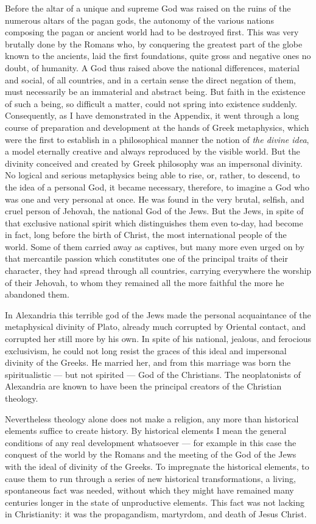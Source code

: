 \documentclass[12pt]{report}
\begin{document}
Before the altar of a unique and supreme God was raised on the ruins of the numerous altars of the pagan gods, the autonomy of the various nations composing the pagan or ancient world had to be destroyed first. This was very brutally done by the Romans who, by conquering the greatest part of the globe known to the ancients, laid the first foundations, quite gross and negative ones no doubt, of humanity. A God thus raised above the national differences, material and social, of all countries, and in a certain sense the direct negation of them, must necessarily be an immaterial and abstract being. But faith in the existence of such a being, so difficult a matter, could not spring into existence suddenly. Consequently, as I have demonstrated in the Appendix, it went through a long course of preparation and development at the hands of Greek metaphysics, which were the first to establish in a philosophical manner the notion of \emph{the divine idea}, a model eternally creative and always reproduced by the visible world. But the divinity conceived and created by Greek philosophy was an impersonal divinity. No logical and serious metaphysics being able to rise, or, rather, to descend, to the idea of a personal God, it became necessary, therefore, to imagine a God who was one and very personal at once. He was found in the very brutal, selfish, and cruel person of Jehovah, the national God of the Jews. But the Jews, in spite of that exclusive national spirit which distinguishes them even to-day, had become in fact, long before the birth of Christ, the most international people of the world. Some of them carried away as captives, but many more even urged on by that mercantile passion which constitutes one of the principal traits of their character, they had spread through all countries, carrying everywhere the worship of their Jehovah, to whom they remained all the more faithful the more he abandoned them.


In Alexandria this terrible god of the Jews made the personal acquaintance of the metaphysical divinity of Plato, already much corrupted by Oriental contact, and corrupted her still more by his own. In spite of his national, jealous, and ferocious exclusivism, he could not long resist the graces of this ideal and impersonal divinity of the Greeks. He married her, and from this marriage was born the spiritualistic — but not spirited — God of the Christians. The neoplatonists of Alexandria are known to have been the principal creators of the Christian theology.


Nevertheless theology alone does not make a religion, any more than historical elements suffice to create history. By historical elements I mean the general conditions of any real development whatsoever — for example in this case the conquest of the world by the Romans and the meeting of the God of the Jews with the ideal of divinity of the Greeks. To impregnate the historical elements, to cause them to run through a series of new historical transformations, a living, spontaneous fact was needed, without which they might have remained many centuries longer in the state of unproductive elements. This fact was not lacking in Christianity: it was the propagandism, martyrdom, and death of Jesus Christ.
\end{document}
